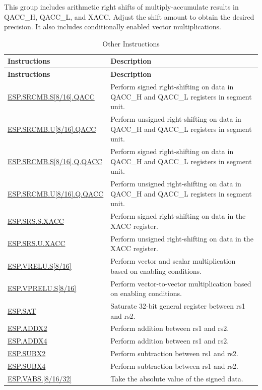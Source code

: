 \documentclass[main\_\_EN.tex]{subfiles}
\begin{document}
This group includes arithmetic right shifts of multiply-accumulate results in QACC\_H, QACC\_L, and XACC. Adjust the shift amount to obtain the desired precision. It also includes conditionally enabled vector multiplications.

\begin{longtable}[c]{|l|m{11cm}|}
    \caption{Other Instructions}
    \label{tab:pie-others-instructions}\\
    \hline
    \rowcolor{lightgray}
    \textbf{Instructions} & \textbf{Description} \\\hline
    \endfirsthead
    \rowcolor{lightgray}
    \textbf{Instructions} & \textbf{Description} \\\hline
    \endhead
    \endfoot

    \hyperref[instruction:ESPSRCMBS8QACC]{ESP.SRCMB.S[8/16].QACC} & Perform signed right-shifting on data in QACC\_H and QACC\_L registers in segment unit.
    \\\hline
    \hyperref[instruction:ESPSRCMBU8QACC]{ESP.SRCMB.U[8/16].QACC} & Perform unsigned right-shifting on data in QACC\_H and QACC\_L registers in segment unit.
    \\\hline
    \hyperref[instruction:ESPSRCMBS8QQACC]{ESP.SRCMB.S[8/16].Q.QACC} & Perform signed right-shifting on data in QACC\_H and QACC\_L registers in segment unit.
    \\\hline
    \hyperref[instruction:ESPSRCMBU8QQACC]{ESP.SRCMB.U[8/16].Q.QACC} & Perform unsigned right-shifting on data in QACC\_H and QACC\_L registers in segment unit.
    \\\hline
    \hyperref[instruction:ESPSRSSXACC]{ESP.SRS.S.XACC} & Perform signed right-shifting on data in the XACC register.
    \\\hline
    \hyperref[instruction:ESPSRSUXACC]{ESP.SRS.U.XACC} & Perform unsigned right-shifting on data in the XACC register.
    \\\hline
    \hyperref[instruction:ESPVRELUS8]{ESP.VRELU.S[8/16]} & Perform vector and scalar multiplication based on enabling conditions.
    \\\hline
    \hyperref[instruction:ESPVPRELUS8]{ESP.VPRELU.S[8/16]} & Perform vector-to-vector multiplication based on enabling conditions.
    \\\hline
    \hyperref[instruction:ESPSAT]{ESP.SAT} & Saturate 32-bit general register between rs1 and rs2.
    \\\hline
    \hyperref[instruction:ESPADDX2]{ESP.ADDX2} & Perform addition between rs1 and rs2.
    \\\hline
    \hyperref[instruction:ESPADDX4]{ESP.ADDX4} & Perform addition between rs1 and rs2.
    \\\hline
    \hyperref[instruction:ESPSUBX2]{ESP.SUBX2} & Perform subtraction between rs1 and rs2.
    \\\hline
    \hyperref[instruction:ESPSUBX4]{ESP.SUBX4} & Perform subtraction between rs1 and rs2.
    \\\hline
    \hyperref[instruction:ESPVABS8]{ESP.VABS.[8/16/32]} & Take the absolute value of the signed data.
    \\\hline

\end{longtable}
\end{document}
